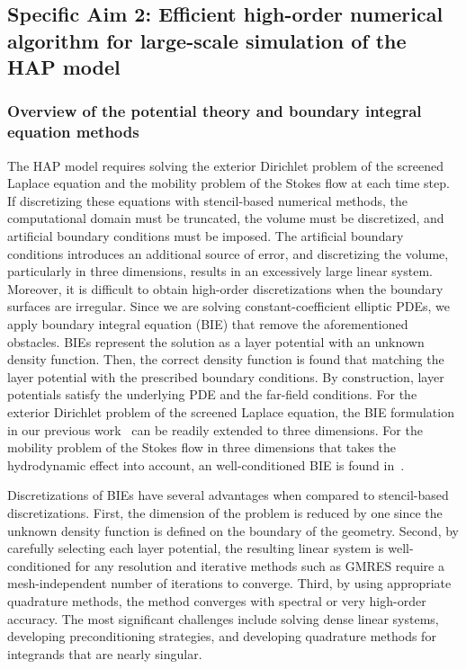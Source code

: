 \subsection{Specific Aim 2: Efficient high-order numerical algorithm for
large-scale simulation of the HAP model}
\label{subsec:specific_aim_2}
\subsubsection{Overview of the potential theory and boundary integral
equation methods} 
The HAP model requires solving the exterior Dirichlet problem of the
screened Laplace equation and the mobility problem of the Stokes flow at
each time step. If discretizing these equations with stencil-based
numerical methods, the computational domain must be truncated, the
volume must be discretized, and artificial boundary conditions must be
imposed. The artificial boundary conditions introduces an additional
source of error, and discretizing the volume, particularly in three
dimensions, results in an excessively large linear system. Moreover, it
is difficult to obtain high-order discretizations when the boundary
surfaces are irregular. Since we are solving constant-coefficient
elliptic PDEs, we apply boundary integral equation (BIE) that remove the
aforementioned obstacles. BIEs represent the solution as a layer
potential with an unknown density function. Then, the correct density
function is found that matching the layer potential with the prescribed
boundary conditions. By construction, layer potentials satisfy the
underlying PDE and the far-field conditions. For the exterior Dirichlet
problem of the screened Laplace equation, the BIE formulation in our
previous work~\cite{Fu2018_SIAM} can be readily extended to three
dimensions. For the mobility problem of the Stokes flow in three
dimensions that takes the hydrodynamic effect into account, an
well-conditioned BIE is found in~\cite{manasthesis}.

Discretizations of BIEs have several advantages when compared to
stencil-based discretizations. First, the dimension of the problem is
reduced by one since the unknown density function is defined on the
boundary of the geometry. Second, by carefully selecting each layer
potential, the resulting linear system is well-conditioned for any
resolution and iterative methods such as GMRES require a
mesh-independent number of iterations to converge. Third, by using
appropriate quadrature methods, the method converges with spectral or
very high-order accuracy. The most significant challenges include
solving dense linear systems, developing preconditioning strategies, and
developing quadrature methods for integrands that are nearly singular. 

